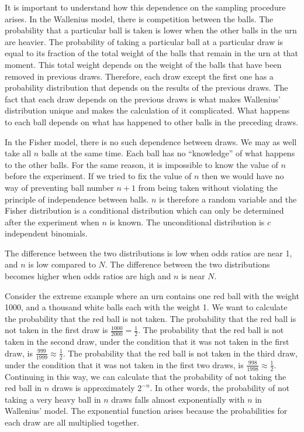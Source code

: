 \documentclass[a4paper]{article}
\begin{document}
It is important to understand how this dependence on the sampling procedure
arises. In the Wallenius model, there is competition between the balls.
The probability that a particular ball is taken is lower when the other 
balls in the urn are heavier. The probability of taking a particular ball
at a particular draw is equal to its fraction of the total weight of the
balls that remain in the urn at that moment. This total weight 
depends on the weight of
the balls that have been removed in previous draws. Therefore, each draw
except the first one has a probability distribution that depends on the
results of the previous draws. The fact that each draw depends on the 
previous draws is what makes Wallenius' distribution unique and makes the
calculation of it complicated. What happens to each ball depends on what
has happened to other balls in the preceding draws.

In the Fisher model, there is no such dependence between draws. We may 
as well take all $n$ balls at the same time. Each ball
has no ``knowledge'' of what happens to the other balls. For the same 
reason, it is impossible to know the value of $n$ before the experiment.
If we tried to fix the value of $n$ then we would have no way of 
preventing ball number $n+1$ from being taken without violating the principle
of independence between balls. $n$ is therefore a random variable and
the Fisher distribution is a conditional distribution which can only
be determined after the experiment when $n$ is known. The unconditional
distribution is $c$ independent binomials.

The difference between the two distributions is low when odds ratios are
near 1, and $n$ is low compared to $N$. The difference between the two 
distributions becomes higher when odds ratios are high and $n$ is near $N$.

Consider the extreme example where an urn contains one red ball with the
weight 1000, and a thousand white balls each with the weight 1. 
We want to calculate the probability that the red ball is not taken.
The probability that the red ball is not taken in the first draw is 
$\frac{1000}{2000} = \frac 12$. The probability that the red ball is
not taken in the second draw, under the condition that it was not taken
in the first draw, is $\frac{999}{1999} \approx \frac 12$.
The probability that the red ball is
not taken in the third draw, under the condition that it was not taken
in the first two draws, is $\frac{998}{1998} \approx \frac 12$. 
Continuing in this way, we can calculate that the probability of not
taking the red ball in $n$ draws is approximately $2^{-n}$. 
In other words, the probability of not taking a very heavy ball in $n$ 
draws falls almost exponentially with $n$ in Wallenius' model.
The exponential function arises because the probabilities for each draw
are all multiplied together.
\end{document}
